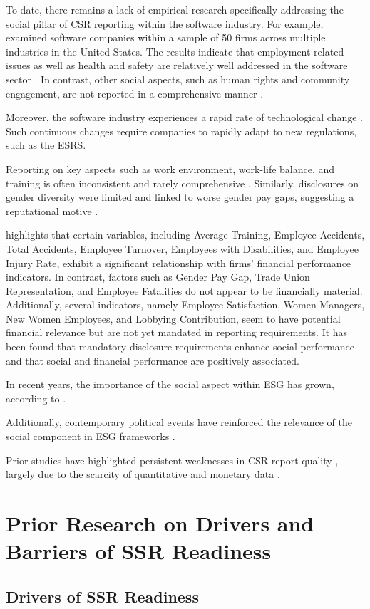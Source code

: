 To date, there remains a lack of empirical research specifically addressing the social pillar of CSR reporting 
within the software industry. For example, \textcite{Holder-Webb2009} examined software companies within a sample 
of 50 firms across multiple industries in the United States. The results indicate that employment-related issues 
as well as health and safety are relatively well addressed in the software sector \parencite{Holder-Webb2009}. 
In contrast, other social aspects, such as human rights and community engagement, are not reported in a 
comprehensive manner \parencite{Holder-Webb2009}.

Moreover, the software industry experiences a rapid rate of technological change \parencite{Li2010}.
Such continuous changes require companies to rapidly adapt to new regulations, such as the ESRS. 

Reporting on key aspects such as work environment, work-life balance, 
and training is often inconsistent and rarely comprehensive \parencite{Greig2021}. Similarly,
disclosures on gender diversity were limited and linked to worse gender pay gaps,
suggesting a reputational motive \parencite{Huang2022}.

\textcite{Bornar2025} highlights that certain variables, including Average Training, Employee Accidents, 
Total Accidents, Employee Turnover, Employees with Disabilities, and Employee Injury Rate, exhibit 
a significant relationship with firms' financial performance indicators. In contrast, factors such as Gender Pay Gap, 
Trade Union Representation, and Employee Fatalities do not appear to be financially material. Additionally, 
several indicators, namely Employee Satisfaction, Women Managers, New Women Employees, and Lobbying Contribution, 
seem to have potential financial relevance but are not yet mandated in reporting requirements.
It has been found that mandatory disclosure requirements enhance social performance and that social 
and financial performance are positively associated.

In recent years, the importance of the social aspect within ESG has grown, according to \textcite{BaidJayaraman2022}. 

Additionally, contemporary political events have reinforced the relevance of the social component in ESG frameworks 
\parencite{She2022}.

Prior studies have highlighted 
persistent weaknesses in CSR report quality \parencite{DiChiacchio2024}, largely due to the scarcity of 
quantitative and monetary data \parencite{Michelon2015}.

\section{Prior Research on Drivers and Barriers of SSR Readiness}

\subsection{Drivers of SSR Readiness}









